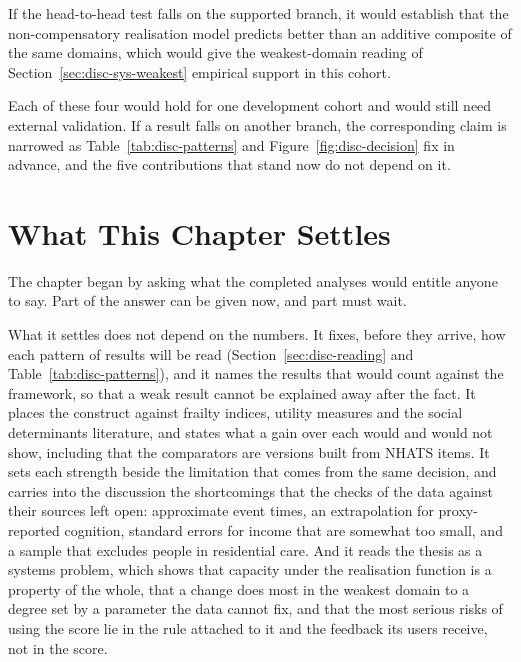 If the head-to-head test falls on the supported branch, it would establish that
the non-compensatory realisation model predicts better than an additive composite
of the same domains, which would give the weakest-domain reading of
Section~\ref{sec:disc-sys-weakest} empirical support in this cohort.

Each of these four would hold for one development cohort and would still need
external validation. If a result falls on another branch, the corresponding claim
is narrowed as Table~\ref{tab:disc-patterns} and
Figure~\ref{fig:disc-decision} fix in advance, and the five contributions that
stand now do not depend on it.

\section{What This Chapter Settles}
\label{sec:disc-close}

\noindent The chapter began by asking what the completed analyses would entitle
anyone to say. Part of the answer can be given now, and part must wait.

What it settles does not depend on the numbers. It fixes, before they arrive, how
each pattern of results will be read (Section~\ref{sec:disc-reading} and
Table~\ref{tab:disc-patterns}), and it names the results that would count against
the framework, so that a weak result cannot be explained away after the fact. It
places the construct against frailty indices, utility measures and the social
determinants literature, and states what a gain over each would and would not show,
including that the comparators are versions built from NHATS items. It sets each
strength beside the limitation that comes from the same decision, and carries into
the discussion the shortcomings that the checks of the data against their sources
left open: approximate event times, an extrapolation for proxy-reported cognition,
standard errors for income that are somewhat too small, and a sample that excludes
people in residential care. And it reads the thesis as a systems problem, which
shows that capacity under the realisation function is a property of the whole, that
a change does most in the weakest domain to a degree set by a parameter the data
cannot fix, and that the most serious risks of using the score lie in the rule
attached to it and the feedback its users receive, not in the score.

